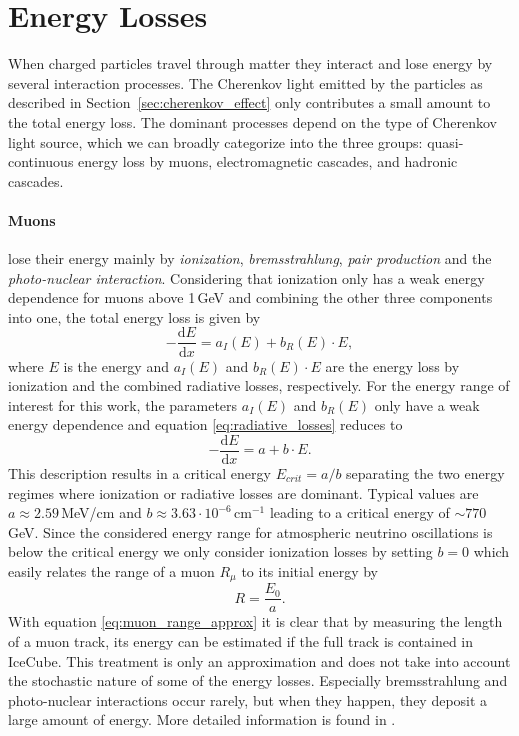 \section{Energy Losses} \label{sec:energy_loss}

When charged particles travel through matter they interact and lose energy by several interaction processes.
The Cherenkov light emitted by the particles as described in Section~\ref{sec:cherenkov_effect} only contributes a small amount to the total energy loss.
The dominant processes depend on the type of Cherenkov light source, which we can broadly categorize into the three groups: quasi-continuous energy loss by muons, electromagnetic cascades, and hadronic cascades.

\paragraph{Muons} lose their energy mainly by \textit{ionization}, \textit{bremsstrahlung}, \textit{pair production} and the \textit{photo-nuclear interaction}.
Considering that ionization only has a weak energy dependence for muons above 1\,GeV and combining the other three components into one, the total energy loss is given by
\begin{equation}
    -\frac{\mathrm{d}E}{\mathrm{d}x} = a_I(E) + b_R(E) \cdot E,
    \label{eq:radiative_losses}
\end{equation}
where $E$ is the energy and $a_I(E)$ and $b_R(E) \cdot E$ are the energy loss by ionization and the combined radiative losses, respectively.
For the energy range of interest for this work, the parameters $a_I(E)$ and $b_R(E)$ only have a weak energy dependence and equation \ref{eq:radiative_losses} reduces to
\begin{equation}
    -\frac{\mathrm{d}E}{\mathrm{d}x} = a + b \cdot E.
    \label{eq:radiative_losses_simple}
\end{equation}
This description results in a critical energy $E_{crit}=a/b$ separating the two energy regimes where ionization or radiative losses are dominant.
Typical values are $a \approx 2.59$\,MeV/cm and $b \approx 3.63 \cdot 10^{-6}$\,cm$^{-1}$ \cite{2004hep.ph....7075C} leading to a critical energy of $\sim 770$\,GeV.
Since the considered energy range for atmospheric neutrino oscillations is below the critical energy we only consider ionization losses by setting $b=0$ which easily relates the range of a muon $R_\mu$ to its initial energy by
\begin{equation}
    R = \frac{E_0}{a}.
    \label{eq:muon_range_approx}
\end{equation}
With equation \ref{eq:muon_range_approx} it is clear that by measuring the length of a muon track, its energy can be estimated if the full track is contained in IceCube.
This treatment is only an approximation and does not take into account the stochastic nature of some of the energy losses.
Especially bremsstrahlung and photo-nuclear interactions occur rarely, but when they happen, they deposit a large amount of energy. More detailed information is found in \cite{LRaedel}.


